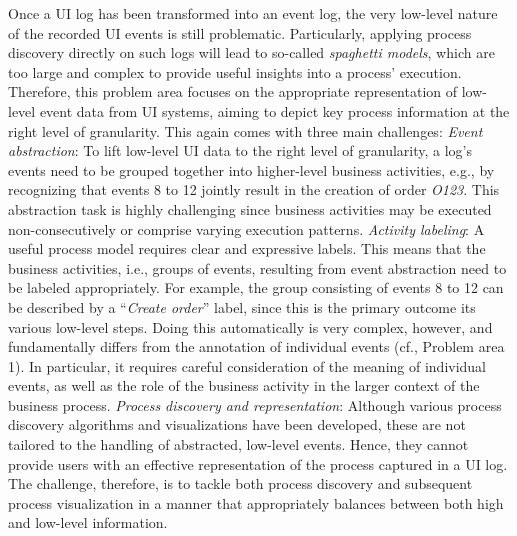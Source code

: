 Once a UI log has been transformed into an event log, the very low-level nature of the recorded UI events is still problematic. Particularly, applying process discovery directly on such logs will lead to so-called \emph{spaghetti models}, which are too large and complex to provide useful insights into a process' execution.
Therefore, this problem area focuses on the appropriate representation of low-level event data from UI systems, aiming to depict key process information at the right level of granularity. This again comes with three main challenges: 
\vspace{0.2em}
\newline%
\noindent\textit{Event abstraction}: To lift low-level UI data to the right level of granularity, a log's events need to be grouped together into higher-level business activities, e.g., by recognizing that events 8 to 12 jointly result in the creation of order \emph{O123}. This abstraction task is highly challenging since business activities may be executed non-consecutively or comprise varying execution patterns.
\vspace{0.2em}
\newline%
\noindent \textit{Activity labeling}: A useful process model requires clear and expressive labels. 
This means that the business activities, i.e., groups of events,  resulting from event abstraction need to be labeled appropriately. For example, the group consisting of events 8 to 12 can be described by a ``\textit{Create order}'' label, since this is the primary outcome its various low-level steps. Doing this automatically is very complex, however, and fundamentally differs from the annotation of individual events (cf., Problem area 1). In particular, it requires careful consideration of the meaning of individual events, as well as the role of the business activity in the larger context of the business process.
 \vspace{0.2em}
 \newline%
\noindent \textit{Process discovery and representation}: 
Although various process discovery algorithms and visualizations have been developed, these are not tailored to the handling of abstracted, low-level events. Hence, they cannot provide users with an effective representation of the process captured in a UI log.  The challenge, therefore, is to tackle both process discovery and  subsequent process visualization in a manner that appropriately balances between both high and low-level information.

